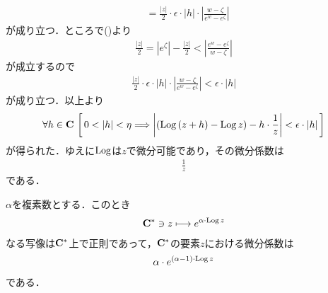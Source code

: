 \begin{sketch}
\begin{description}
\begin{align}
					&= \frac{|z|}{2} \cdot \epsilon \cdot |h| \cdot \left|\frac{w-\zeta}{e^{w} - e^{\zeta}}\right|
				\end{align}
				が成り立つ．ところで()より
				\begin{align}
					\frac{|z|}{2} = |e^{\zeta}| - \frac{|z|}{2} 
					< \left|\frac{e^{w} - e^{\zeta}}{w- \zeta}\right|
				\end{align}
				が成立するので
				\begin{align}
					\frac{|z|}{2} \cdot \epsilon \cdot |h| \cdot \left|\frac{w-\zeta}{e^{w} - e^{\zeta}}\right|
					< \epsilon \cdot |h|
				\end{align}
				が成り立つ．以上より
				\begin{align}
					\forall h \in \mathbf{C}\,
					\left[\, 0 < |h| < \eta \Longrightarrow \left|(\operatorname{Log}{(z+h)} - \operatorname{Log}{z}) - h \cdot \frac{1}{z}\right| < \epsilon \cdot |h|\, \right]
				\end{align}
				が得られた．ゆえに$\operatorname{Log}$は$z$で微分可能であり，その微分係数は
				\begin{align}
					\frac{1}{z}
				\end{align}
				である．
				\QED
		\end{description}
	\end{sketch}
	
	\begin{screen}
		\begin{thm}
			$\alpha$を複素数とする．このとき
			\begin{align}
				\mathbf{C}^* \ni z \longmapsto e^{\alpha \cdot \operatorname{Log}{z}}
			\end{align}
			なる写像は$\mathbf{C}^*$上で正則であって，$\mathbf{C}^*$の要素$z$における微分係数は
			\begin{align}
				\alpha \cdot e^{(\alpha-1) \cdot \operatorname{Log}{z}}
			\end{align}
			である．
		\end{thm}
	\end{screen}